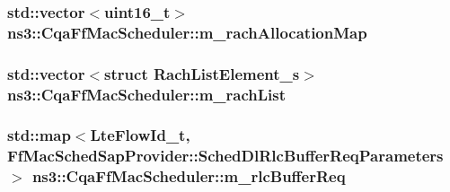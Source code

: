 \subsubsection[{\texorpdfstring{m\+\_\+rach\+Allocation\+Map}{m_rachAllocationMap}}]{\setlength{\rightskip}{0pt plus 5cm}std\+::vector$<$uint16\+\_\+t$>$ ns3\+::\+Cqa\+Ff\+Mac\+Scheduler\+::m\+\_\+rach\+Allocation\+Map\hspace{0.3cm}{\ttfamily [private]}}\hypertarget{classns3_1_1CqaFfMacScheduler_a813fe1147a11b3b5c34d9a345535a920}{}\label{classns3_1_1CqaFfMacScheduler_a813fe1147a11b3b5c34d9a345535a920}
\subsubsection[{\texorpdfstring{m\+\_\+rach\+List}{m_rachList}}]{\setlength{\rightskip}{0pt plus 5cm}std\+::vector$<$struct {\bf Rach\+List\+Element\+\_\+s}$>$ ns3\+::\+Cqa\+Ff\+Mac\+Scheduler\+::m\+\_\+rach\+List\hspace{0.3cm}{\ttfamily [private]}}\hypertarget{classns3_1_1CqaFfMacScheduler_a8acbb79b06264ecc897614a20f77a3ad}{}\label{classns3_1_1CqaFfMacScheduler_a8acbb79b06264ecc897614a20f77a3ad}
\subsubsection[{\texorpdfstring{m\+\_\+rlc\+Buffer\+Req}{m_rlcBufferReq}}]{\setlength{\rightskip}{0pt plus 5cm}std\+::map$<${\bf Lte\+Flow\+Id\+\_\+t}, {\bf Ff\+Mac\+Sched\+Sap\+Provider\+::\+Sched\+Dl\+Rlc\+Buffer\+Req\+Parameters}$>$ ns3\+::\+Cqa\+Ff\+Mac\+Scheduler\+::m\+\_\+rlc\+Buffer\+Req\hspace{0.3cm}{\ttfamily [private]}}\hypertarget{classns3_1_1CqaFfMacScheduler_ae9f6c7fc32e6dd08573470c70d827610}{}\label{classns3_1_1CqaFfMacScheduler_ae9f6c7fc32e6dd08573470c70d827610}
